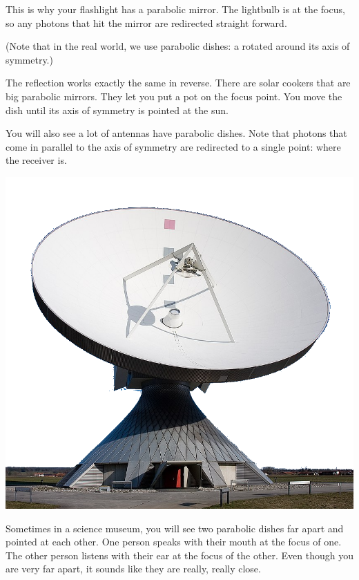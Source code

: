 This is why your flashlight has a parabolic mirror. The lightbulb is
at the focus, so any photons that hit the mirror are redirected
straight forward.

(Note that in the real world, we use parabolic dishes: a rotated around its axis of
symmetry.)

The reflection works exactly the same in reverse. There are solar
cookers that are big parabolic mirrors.  They let you put a pot on the
focus point. You move the dish until its axis of symmetry is pointed
at the sun.

You will also see a lot of antennas have parabolic dishes. Note that
photons that come in parallel to the axis of symmetry are redirected
to a single point: where the receiver is.

\includegraphics[width=0.7\linewidth]{dish.png}



Sometimes in a science museum, you will see two parabolic dishes far
apart and pointed at each other.  One person speaks with their mouth
at the focus of one.  The other person listens with their ear at the
focus of the other. Even though you are very far apart, it sounds like
they are really, really close.

